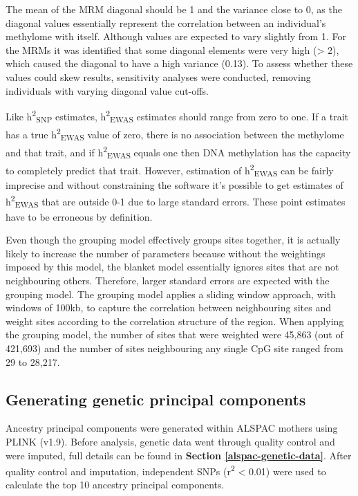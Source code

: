 \documentclass[11pt,twoside]{bristolthesis}
\begin{document}
The mean of the MRM diagonal should be 1 and the variance close to 0, as the diagonal values essentially represent the correlation between an individual's methylome with itself. Although values are expected to vary slightly from 1. For the MRMs it was identified that some diagonal elements were very high (\textgreater{} 2), which caused the diagonal to have a high variance (0.13). To assess whether these values could skew results, sensitivity analyses were conducted, removing individuals with varying diagonal value cut-offs.

Like h\textsuperscript{2}\textsubscript{SNP} estimates, h\textsuperscript{2}\textsubscript{EWAS} estimates should range from zero to one. If a trait has a true h\textsuperscript{2}\textsubscript{EWAS} value of zero, there is no association between the methylome and that trait, and if h\textsuperscript{2}\textsubscript{EWAS} equals one then DNA methylation has the capacity to completely predict that trait. However, estimation of h\textsuperscript{2}\textsubscript{EWAS} can be fairly imprecise and without constraining the software it's possible to get estimates of h\textsuperscript{2}\textsubscript{EWAS} that are outside 0-1 due to large standard errors. These point estimates have to be erroneous by definition.

Even though the grouping model effectively groups sites together, it is actually likely to increase the number of parameters because without the weightings imposed by this model, the blanket model essentially ignores sites that are not neighbouring others. Therefore, larger standard errors are expected with the grouping model. The grouping model applies a sliding window approach, with windows of 100kb, to capture the correlation between neighbouring sites and weight sites according to the correlation structure of the region. When applying the grouping model, the number of sites that were weighted were 45,863 (out of 421,693) and the number of sites neighbouring any single CpG site ranged from 29 to 28,217.

\hypertarget{generating-genetic-principal-components}{%
\subsection{Generating genetic principal components}\label{generating-genetic-principal-components}}

Ancestry principal components were generated within ALSPAC mothers using PLINK (v1.9). Before analysis, genetic data went through quality control and were imputed, full details can be found in \textbf{Section \ref{alspac-genetic-data}}. After quality control and imputation, independent SNPs (r\textsuperscript{2} \textless{} 0.01) were used to calculate the top 10 ancestry principal components.
\end{document}
